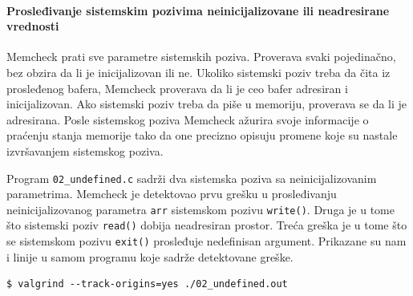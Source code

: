 \paragraph{Prosleđivanje sistemskim pozivima neinicijalizovane ili neadresirane vrednosti}\label{prosleux111ivanje-sistemskim-pozivima-neinicijalizovane-ili-neadresirane-vrednosti}

Memcheck prati sve parametre sistemskih poziva. Proverava svaki pojedinačno, bez obzira da li je inicijalizovan ili ne. Ukoliko sistemski poziv treba da čita iz prosleđenog bafera, Memcheck proverava da li je ceo bafer adresiran i inicijalizovan. Ako sistemski poziv treba da piše u memoriju, proverava se da li je adresirana. Posle sistemskog poziva Memcheck ažurira svoje informacije o praćenju stanja memorije tako da one precizno opisuju promene koje su nastale izvršavanjem sistemskog poziva.

Program \texttt{02\_undefined.c} sadrži dva sistemska poziva sa neinicijalizovanim parametrima. Memcheck je detektovao prvu grešku u prosleđivanju neinicijalizovanog parametra \texttt{arr} sistemskom pozivu \texttt{write()}. Druga je u tome što sistemski poziv \texttt{read()} dobija neadresiran prostor. Treća greška je u tome što se sistemskom pozivu \texttt{exit()} prosleđuje nedefinisan argument. Prikazane su nam i linije u samom programu koje sadrže detektovane greške.

\begin{verbatim}
$ valgrind --track-origins=yes ./02_undefined.out
\end{verbatim}

